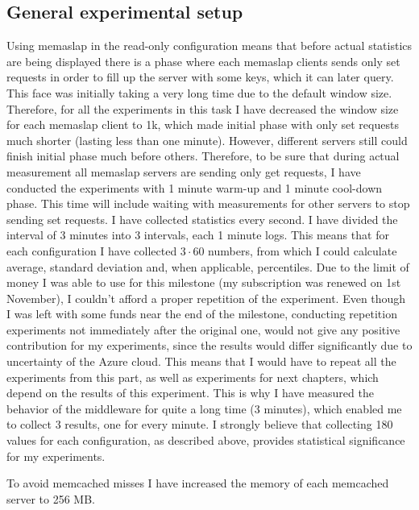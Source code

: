 \documentclass[11pt]{article}
\begin{document}
\subsection{General experimental setup}
Using memaslap in the read-only configuration means that before actual statistics are being displayed there is a phase where each memaslap clients sends only set requests in order to fill up the server with some keys, which it can later query. This face was initially taking a very long time due to the default window size. Therefore, for all the experiments in this task I have decreased the window size for each memaslap client to 1k, which made initial phase with only set requests much shorter (lasting less than one minute). However, different servers still could finish initial phase much before others. Therefore, to be sure that during actual measurement all memaslap servers are sending only get requests, I have conducted the experiments with 1 minute warm-up and 1 minute cool-down phase.
This time will include waiting with measurements for other servers to stop sending set requests. I have collected statistics every second. I have divided the interval of 3 minutes into 3 intervals, each 1 minute logs. This means that for each configuration I have collected $3\cdot60$ numbers, from which I could calculate average, standard deviation and, when applicable, percentiles. Due to the limit of money I was able to use for this milestone (my subscription was renewed on 1st November), I couldn't afford a proper repetition of the experiment. Even though I was left with some funds near the end of the milestone, conducting repetition experiments not immediately after the original one, would not give any positive contribution for my experiments, since the results would differ significantly due to uncertainty of the Azure cloud. This means that I would have to repeat all the experiments from this part, as well as experiments for next chapters, which depend on the results of this experiment. This is why I have measured the behavior of the middleware for quite a long time (3 minutes), which enabled me to collect 3 results, one for every minute. 
I strongly believe that collecting 180 values for each configuration, as described above, provides statistical significance for my experiments.   

To avoid memcached misses I have increased the memory of each memcached server to 256 MB.
\end{document}
